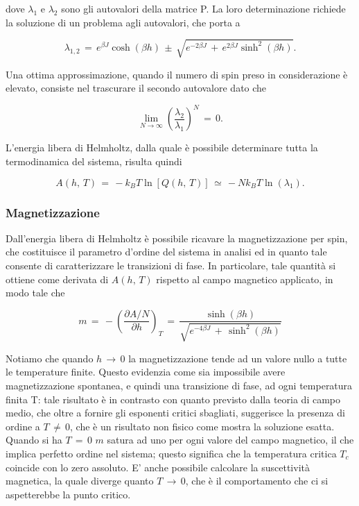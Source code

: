 dove $\lambda_1$ e $\lambda_2$ sono gli autovalori della matrice P. La loro determinazione richiede la soluzione di un problema agli 
autovalori, che porta a 

\begin{equation}
    \lambda_{1,2}\,=\,e^{\beta J} \cosh{\left(\beta h\right)}\,\pm\,\sqrt{e^{- 2 \beta J}\,+\,e^{2 \beta J} \sinh^2{\left(\beta h\right)}}.
    \label{eq: autoval_P}
\end{equation}

Una ottima approssimazione, quando il numero di spin preso in considerazione è elevato, consiste nel trascurare il secondo autovalore 
dato che 

\begin{equation}
    \lim_{N \to \infty} \left(\frac{\lambda_2}{\lambda_1}\right)^N\,=\,0.
    \label{eq: approx_Q}
\end{equation}

L'energia libera di Helmholtz, dalla quale è possibile determinare tutta la termodinamica del sistema, risulta quindi

\begin{equation}
    A\left(h,\,T\right)\,=\,-k_B T \ln{\left[Q\left(h,\,T\right)\right]}\,\simeq\,-Nk_BT \ln{\left(\lambda_1\right)}.
    \label{eq: en_lib}
\end{equation}



\subsubsection{Magnetizzazione}

Dall'energia libera di Helmholtz è possibile ricavare la magnetizzazione per spin, che costituisce il parametro d'ordine del 
sistema in analisi ed in quanto tale consente di caratterizzare le transizioni di fase. In particolare, tale quantità si 
ottiene come derivata di $A\left(h,\,T\right)$ rispetto al campo magnetico applicato, in modo tale che

\begin{equation}
    m\,=\,-\left(\frac{\partial A/N}{\partial h}\right)_T\,=\,\frac{\sinh{\left(\beta h\right)}}{\sqrt{e^{-4\beta J}\,+\,\sinh^2\left(\beta h\right)}}
    \label{eq: magn_Ising1D_corr}
\end{equation}

Notiamo che quando $h\,\to\,0$ la magnetizzazione tende ad un valore nullo a tutte le temperature finite. Questo evidenzia 
come sia impossibile avere magnetizzazione spontanea, e quindi una transizione di fase, ad ogni temperatura finita T: tale risultato 
è in contrasto con quanto previsto dalla teoria di campo medio, che oltre a fornire gli esponenti critici sbagliati, suggerisce la 
presenza di ordine a $T\,\neq\,0$, che è un risultato non fisico come mostra la soluzione esatta. Quando si ha $T\,=\,0$ $m$ satura ad 
uno per ogni valore del campo magnetico, il che implica perfetto ordine nel sistema; questo significa che la temperatura critica 
$T_c$ coincide con lo zero assoluto. E' anche possibile calcolare la suscettività magnetica, la quale diverge 
quanto $T\,\to\,0$, che è il comportamento che ci si aspetterebbe la punto critico.



